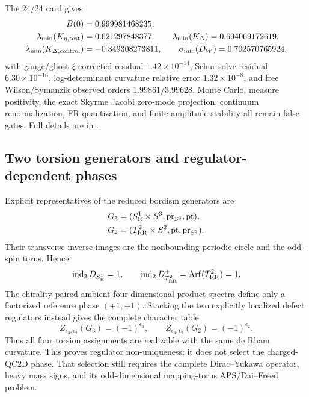 \documentclass[11pt]{article}
\numberwithin{equation}{section}
\newcommand{\ind}{\operatorname{ind}}
\newcommand{\Arf}{\operatorname{Arf}}
\begin{document}
The \(24/24\) card gives
\begin{align}
 B(0)&=0.999981468235,\nonumber\\
 \lambda_{\min}(K_{\eta,{\rm test}})&=0.621297848377,\qquad
 \lambda_{\min}(K_\Delta)=0.694069172619,\nonumber\\
 \lambda_{\min}(K_{\Delta,{\rm control}})&=-0.349308273811,\qquad
 \sigma_{\min}(D_W)=0.702570765924,
 \label{eq:frontier-lattice-numbers}
\end{align}
with gauge/ghost \(\xi\)-corrected residual \(1.42\times10^{-14}\), Schur
solve residual \(6.30\times10^{-16}\), log-determinant curvature relative
error \(1.32\times10^{-8}\), and free Wilson/Symanzik observed orders
\(1.99861/3.99628\).  Monte Carlo, measure positivity, the exact Skyrme
Jacobi zero-mode projection, continuum renormalization, FR quantization, and
finite-amplitude stability all remain false gates.  Full details are in
.

\subsection{Two torsion generators and regulator-dependent phases}

Explicit representatives of the reduced bordism generators are
\begin{align}
 G_3&=(S^1_{\rm R}\times S^3,\operatorname{pr}_{S^3},{\rm pt}),
 \nonumber\\
 G_2&=(T^2_{\rm RR}\times S^2,{\rm pt},\operatorname{pr}_{S^2}).
 \label{eq:frontier-bordism-generators}
\end{align}
Their transverse inverse images are the nonbounding periodic circle and the
odd-spin torus.  Hence
\begin{equation}
 \ind_2D_{S^1_{\rm R}}=1,\qquad
 \ind_2D^+_{T^2_{\rm RR}}=\Arf(T^2_{\rm RR})=1.
 \label{eq:frontier-mod-two}
\end{equation}
The chirality-paired ambient four-dimensional product spectra define only a
factorized reference phase \((+1,+1)\).  Stacking the two explicitly
localized defect regulators instead gives the complete character table
\begin{equation}
 Z_{\epsilon_3,\epsilon_2}(G_3)=(-1)^{\epsilon_3},
 \qquad
 Z_{\epsilon_3,\epsilon_2}(G_2)=(-1)^{\epsilon_2}.
 \label{eq:frontier-character-table}
\end{equation}
Thus all four torsion assignments are realizable with the same de Rham
curvature.  This proves regulator non-uniqueness; it does not select the
charged-QC2D phase.  That selection still requires the complete
Dirac--Yukawa operator, heavy mass signs, and its odd-dimensional
mapping-torus APS/Dai--Freed problem.
\end{document}
